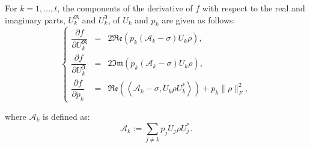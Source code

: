 \documentclass[onefignum,onetabnum]{siamart220329}
\newcommand{\inner}[1]{\left<#1\right>}
\begin{document}
    \begin{theorem}\label{thm:gradient}
    For $k = 1, \ldots, t$, the components of the derivative of $f$ with respect to the real and imaginary parts,  $ 
    U_k^\mathfrak{R}
    $  and $ 
    U_k^\mathfrak{I}
    $,  
    of $U_k$ and $p_k$ are given as follows:
    \begin{equation}\label{eq:par2}
    \left\{
        \begin{array}{ccl}
            \dfrac{\partial f}{\partial U_k^\mathfrak{R}} &=&  2 \mathfrak{Re}\left(p_k\left( \mathcal{A}_k - \sigma \right) U_k \rho\right), \\[10pt]
            \dfrac{\partial f}{\partial U_k^\mathfrak{I}} &=& 2 \mathfrak{Im}\left(p_k\left(\mathcal{A}_k - \sigma \right) U_k \rho\right), \\[10pt]
            \dfrac{\partial f}{\partial p_k} &=& 
            \mathfrak{Re}\left(\inner{\mathcal{A}_k - \sigma, U_k \rho U_k^*}\right)+p_k \|\rho\|_F^2,
        \end{array}
    \right.
\end{equation}

    where $\mathcal{A}_k$ is defined as:
    \begin{equation*}
        \mathcal{A}_k := \sum_{j \neq k} p_j U_j \rho U_j^*.
    \end{equation*}
    \end{theorem}
\end{document}
